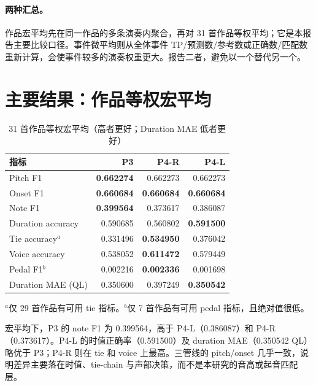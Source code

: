 \documentclass[UTF8,a4paper,11pt]{ctexart}
\newcommand{\best}[1]{\textbf{#1}}
\begin{document}
\paragraph{两种汇总。}作品宏平均先在同一作品的多条演奏内聚合，再对 31 首作品等权平均；它是本报告主要比较口径。事件微平均则从全体事件 TP/预测数/参考数或正确数/匹配数重新计算，会使事件较多的演奏权重更大。报告二者，避免以一个替代另一个。

\section{主要结果：作品等权宏平均}
\begin{table}[h]
\centering
\caption{31 首作品等权宏平均（高者更好；Duration MAE 低者更好）}
\small
\begin{tabular}{@{}lrrr@{}}
\toprule
指标 & P3 & P4-R & P4-L\\
\midrule
Pitch F1 & \best{0.662274} & 0.662273 & 0.662273\\
Onset F1 & \best{0.660684} & \best{0.660684} & \best{0.660684}\\
Note F1 & \best{0.399564} & 0.373617 & 0.386087\\
Duration accuracy & 0.590685 & 0.560802 & \best{0.591500}\\
Tie accuracy$^{a}$ & 0.331496 & \best{0.534950} & 0.376042\\
Voice accuracy & 0.538052 & \best{0.611472} & 0.579449\\
Pedal F1$^{b}$ & 0.002216 & \best{0.002336} & 0.001698\\
Duration MAE (QL) & 0.350600 & 0.397249 & \best{0.350542}\\
\bottomrule
\end{tabular}
\begin{flushleft}\footnotesize $^{a}$仅 29 首作品有可用 tie 指标。$^{b}$仅 7 首作品有可用 pedal 指标，且绝对值很低。\end{flushleft}
\end{table}

宏平均下，P3 的 note F1 为 0.399564，高于 P4-L（0.386087）和 P4-R（0.373617）。P4-L 的时值正确率（0.591500）及 duration MAE（0.350542 QL）略优于 P3；P4-R 则在 tie 和 voice 上最高。三管线的 pitch/onset 几乎一致，说明差异主要落在时值、tie-chain 与声部决策，而不是本研究的音高或起音匹配层。
\end{document}
